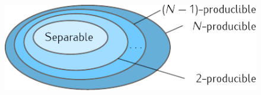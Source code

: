 \begin{figure}
  \centering
  \includegraphics[scale=1.4]{img/BG_separability_k_producibility_circle.pdf}
  \caption[Diagram for $k$-producibility sets]{}
  \label{fig:bg-separability-k-producibility-circle}
\end{figure}

\be
  \label{eq:bg-pezze-bound}
  \qfi[\rho,J_z] \geq {}
\ee
